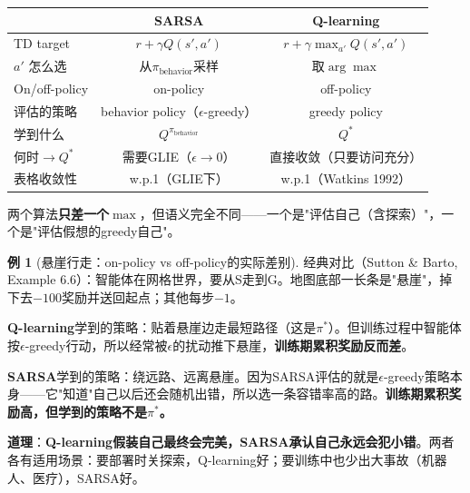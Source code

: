 \documentclass[11pt,a4paper]{article}
\theoremstyle{definition}
\newtheorem{example}{例}[section]
\begin{document}
\begin{keypoint}
\begin{center}
\begin{tabular}{l|c|c}
\toprule
& \textbf{SARSA} & \textbf{Q-learning} \\
\midrule
TD target & $r + \gamma Q(s', a')$ & $r + \gamma \max_{a'} Q(s', a')$ \\
$a'$ 怎么选 & 从$\pi_{\text{behavior}}$采样 & 取$\arg\max$ \\
On/off-policy & on-policy & off-policy \\
评估的策略 & behavior policy（$\epsilon$-greedy） & greedy policy \\
学到什么 & $Q^{\pi_{\text{behavior}}}$ & $Q^*$ \\
何时$\to Q^*$ & 需要GLIE（$\epsilon\to 0$） & 直接收敛（只要访问充分） \\
表格收敛性 & w.p.1（GLIE下） & w.p.1（Watkins 1992） \\
\bottomrule
\end{tabular}
\end{center}

两个算法\textbf{只差一个$\max$}，但语义完全不同——一个是"评估自己（含探索）"，一个是"评估假想的greedy自己"。
\end{keypoint}

\begin{example}[悬崖行走：on-policy vs off-policy的实际差别]
经典对比（Sutton \& Barto, Example 6.6）：智能体在网格世界，要从S走到G。地图底部一长条是"悬崖"，掉下去$-100$奖励并送回起点；其他每步$-1$。

\textbf{Q-learning}学到的策略：贴着悬崖边走最短路径（这是$\pi^*$）。但训练过程中智能体按$\epsilon$-greedy行动，所以经常被$\epsilon$的扰动推下悬崖，\textbf{训练期累积奖励反而差}。

\textbf{SARSA}学到的策略：绕远路、远离悬崖。因为SARSA评估的就是$\epsilon$-greedy策略本身——它"知道"自己以后还会随机出错，所以选一条容错率高的路。\textbf{训练期累积奖励高，但学到的策略不是$\pi^*$。}

\textbf{道理}：\textbf{Q-learning假装自己最终会完美，SARSA承认自己永远会犯小错}。两者各有适用场景：要部署时关探索，Q-learning好；要训练中也少出大事故（机器人、医疗），SARSA好。
\end{example}
\end{document}
